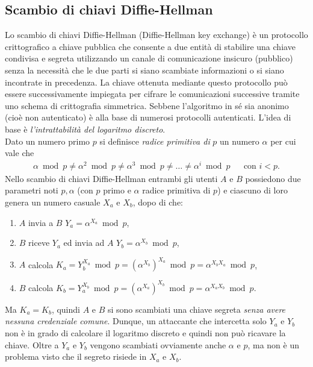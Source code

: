 \subsection{Scambio di chiavi Diffie-Hellman}
Lo scambio di chiavi Diffie-Hellman (Diffie-Hellman key exchange) è un protocollo crittografico a chiave pubblica che consente a due entità di stabilire una chiave condivisa e segreta utilizzando un canale di comunicazione insicuro (pubblico) senza la necessità che le due parti si siano scambiate informazioni o si siano incontrate in precedenza. La chiave ottenuta mediante questo protocollo può essere successivamente impiegata per cifrare le comunicazioni successive tramite uno schema di crittografia simmetrica. Sebbene l'algoritmo in sé sia anonimo (cioè non autenticato) è alla base di numerosi protocolli autenticati. L'idea di base è \textit{l'intrattabilità del logaritmo discreto}.\\
Dato un numero primo $p$ si definisce \textit{radice primitiva di} $p$ un numero $\alpha$ per cui vale che
\begin{align*}
\alpha\bmod p \neq \alpha^2\bmod p \neq \alpha^3\bmod p \neq \dots \neq \alpha^i\bmod p && \text{con } i < p.
\end{align*}
Nello scambio di chiavi Diffie-Hellman entrambi gli utenti $A$ e $B$ possiedono due parametri noti $p, \alpha$ (con $p$ primo e $\alpha$ radice primitiva di $p$) e ciascuno di loro genera un numero casuale $X_a$ e $X_b$, dopo di che:
\begin{enumerate}
	\item $A$ invia a $B$ $Y_a=\alpha^{X_a}\bmod p$,
	\item $B$ riceve $Y_a$ ed invia ad $A$ $Y_b=\alpha^{X_b}\bmod p$,
	\item $A$ calcola $K_a=Y_b^{X_a}\bmod p = (\alpha^{X_b})^{X_a}\bmod p = \alpha^{X_b X_a}\bmod p$,
	\item $B$ calcola $K_b=Y_a^{X_b}\bmod p = (\alpha^{X_a})^{X_b}\bmod p = \alpha^{X_a X_b}\bmod p$.
\end{enumerate}
Ma $K_a = K_b$, quindi $A$ e $B$ si sono scambiati una chiave segreta \textit{senza avere nessuna credenziale comune}. Dunque, un attaccante che intercetta solo $Y_a$ e $Y_b$ non è in grado di calcolare il logaritmo discreto e quindi non può ricavare la chiave. Oltre a $Y_a$ e $Y_b$ vengono scambiati ovviamente anche $\alpha$ e $p$, ma non è un problema visto che il segreto risiede in $X_a$ e $X_b$.

